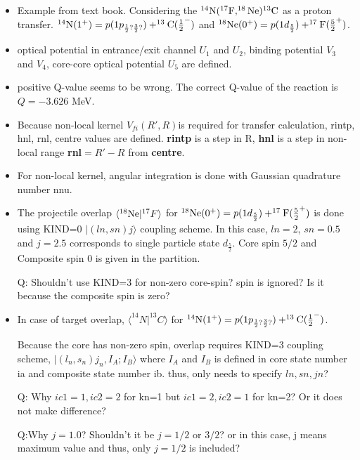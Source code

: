 \documentclass[11pt]{book}
\def\la{\langle}
\def\ra{\rangle}
\begin{document}
\begin{itemize}
\item Example from text book. Considering the ${}^{14}{\rm N}(^{17}{\rm F},^{18}{\rm Ne})^{13}{\rm C}$ as a proton transfer. 
 ${}^{14}{\rm N}(1^+)=p(1p_{\frac{1}{2}?\frac{3}{2}?} )+^{13}{\rm C}(\frac{1}{2}^-)$
 and $^{18}{\rm Ne}(0^+)=p(1d_{\frac{5}{2}})+^{17}{\rm F}(\frac{5}{2}^+)$.  
\item optical potential in entrance/exit channel $U_1$ and $U_2$,  
      binding potential $V_3$ and $V_4$, core-core optical potential $U_5$
      are defined. 
      
\item positive Q-value  seems to be wrong. The correct Q-value of the reaction is $Q=-3.626$ MeV.
\item Because non-local kernel $V_{fi}(R',R)$is required for transfer calculation,
   rintp, hnl, rnl, centre
   values are defined.
   {\bf rintp} is a step in R,
   {\bf hnl} is a step in non-local range {\bf rnl}$=R'-R$ from
   {\bf centre}. 
\item For non-local kernel, angular integration is done with Gaussian quadrature number
  nnu.   
\item The projectile overlap  $\la ^{18}{\rm Ne}|^{17}F\ra$ for
      $^{18}{\rm Ne}(0^+)=p(1d_{\frac{5}{2}})+^{17}{\rm F}(\frac{5}{2}^+)$
      is done using KIND=0 $|(ln,sn)j\ra$ coupling scheme. 
      In this case, $ln=2$, $sn=0.5$ and $j=2.5$ corresponds to 
      single particle state $d_{\frac{5}{2}}$. Core spin $5/2$ and Composite spin $0$
      is given in the partition.  

      Q: Shouldn't use KIND=3 for non-zero core-spin? spin is ignored? 
      Is it because the composite spin is zero? 
      
\item In case of target overlap, $\la ^{14}N|^{13}C\ra$ for 
       ${}^{14}{\rm N}(1^+)=p(1p_{\frac{1}{2}?\frac{3}{2}?} )+^{13}{\rm C}(\frac{1}{2}^-)$.
       
       Because the core has non-zero spin, overlap requires KIND=3 coupling scheme,
       $|(l_n,s_n)j_n,I_A;I_B\ra$ where 
       $I_A$ and $I_B$ is defined in core state number ia      
       and composite state number ib. thus, only needs to specify $ln,sn,jn$? 
       
    Q: Why $ic1=1,ic2=2$ for kn=1 but $ic1=2,ic2=1$ for kn=2? 
       Or it does not make difference? 
       
    Q:Why $j=1.0$? Shouldn't it be $j=1/2$ or $3/2$? or in this case,
      j means maximum value and thus, only $j=1/2$ is included? 
    

\end{itemize}
\end{document}
